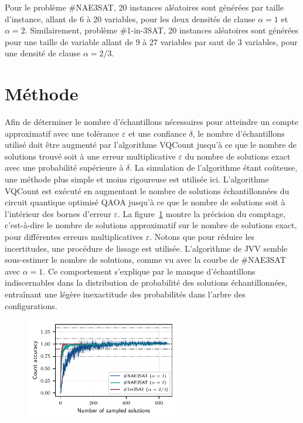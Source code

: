 Pour le problème \#NAE3SAT, 20 instances aléatoires sont générées par taille d'instance, allant de 6 à 20 variables, pour les deux densités de clause $\alpha=1$ et $\alpha = 2$. Similairement, problème \#1-in-3SAT, 20 instances aléatoires sont générées pour une taille de variable allant de 9 à 27 variables par saut de 3 variables, pour une densité de clause $\alpha = 2/3$. 


\section{Méthode}
\label{sec:methode}

Afin de déterminer le nombre d'échantillons nécessaires pour atteindre un compte approximatif avec une tolérance $\varepsilon$ et une confiance $\delta$, le nombre d'échantillons utilisé doit être augmenté par l'algorithme VQCount jusqu'à ce que le nombre de solutions trouvé soit à une erreur multiplicative $\varepsilon$ du nombre de solutions exact avec une probabilité supérieure à $\delta$. La simulation de l'algorithme étant coûteuse, une méthode plus simple et moins rigoureuse est utilisée ici. L'algorithme VQCount est exécuté en augmentant le nombre de solutions échantillonnées du circuit quantique optimisé QAOA jusqu'à ce que le nombre de solutions soit à l'intérieur des bornes d'erreur $\varepsilon$. La figure~\ref{fig:count-accuracy.pdf} montre la précision du comptage, c'est-à-dire le nombre de solutions approximatif sur le nombre de solutions exact, pour différentes erreurs multiplicatives $\varepsilon$. Notons que pour réduire les incertitudes, une procédure de lissage est utilisée. L'algorithme de JVV semble sous-estimer le nombre de solutions, comme vu avec la courbe de \#NAE3SAT avec $\alpha = 1$. Ce comportement s'explique par le manque d'échantillons indiscernables dans la distribution de probabilité des solutions échantillonnées, entraînant une légère inexactitude des probabilités dans l'arbre des configurations. 

\begin{figure}[h!]
    \centering
    \includegraphics[width=0.6\textwidth]{figures/count-accuracy.pdf}
    \caption[Précision du comptage pour des problèmes \textsf{\#P}-difficile]{}
    \label{fig:count-accuracy.pdf}
\end{figure}

